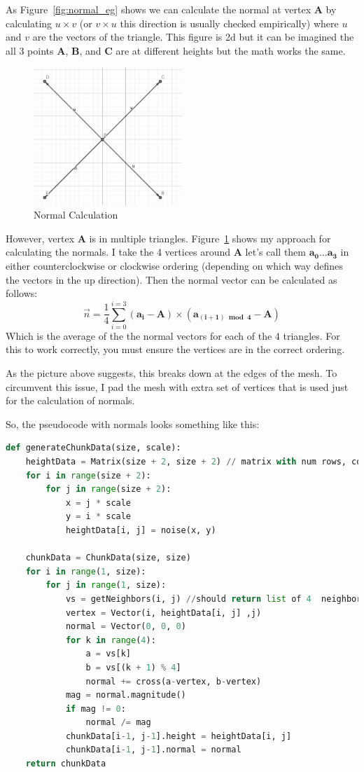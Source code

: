 As Figure~\ref{fig:normal_eg} shows we can calculate the normal at vertex \textbf{A} by calculating $u \times v$ (or $v \times u$ this direction is usually checked empirically) where $u$ and $v$ are the vectors of the triangle. This figure is 2d but it can be imagined the all 3 points \textbf{A}, \textbf{B}, and \textbf{C} are at different heights but the math works the same. 

\begin{figure}[H]
    \centering
    \includegraphics[width=0.5\textwidth]{images/normal_calc.png}
    \caption{Normal Calculation}
    \label{fig:normal_calc}
\end{figure}


However, vertex \textbf{A} is in multiple triangles. Figure~\ref{fig:normal_calc} shows my approach for calculating the normals. I take the 4 vertices around \textbf{A} let's call them $\mathbf{a_0}...\mathbf{a_3}$ in either counterclockwise or clockwise ordering (depending on which way defines the vectors in the up direction). Then the normal vector can be calculated as follows:
\[
\vec{n} = \frac{1}{4}\sum_{i=0}^{i=3}{(\mathbf{a_i}-\mathbf{A}) \times (\mathbf{a_{(i+1) \bmod 4}} - \mathbf{A})}
\]
Which is the average of the the normal vectors for each of the 4 triangles. For this to work correctly, you must ensure the vertices are in the correct ordering.

As the picture above suggests, this breaks down at the edges of the mesh. To circumvent this issue, I pad the mesh with extra set of vertices that is used just for the calculation of normals.

So, the pseudocode with normals looks something like this:
\begin{lstlisting}[language=Python]
def generateChunkData(size, scale):
	heightData = Matrix(size + 2, size + 2) // matrix with num rows, cols = size + 2
	for i in range(size + 2):
		for j in range(size + 2):
			x = j * scale
			y = i * scale
			heightData[i, j] = noise(x, y)
	
	chunkData = ChunkData(size, size)
	for i in range(1, size):
		for j in range(1, size):
			vs = getNeighbors(i, j) //should return list of 4  neighbors in the correct order
			vertex = Vector(i, heightData[i, j] ,j)
			normal = Vector(0, 0, 0)
			for k in range(4):
				a = vs[k]
				b = vs[(k + 1) % 4]
				normal += cross(a-vertex, b-vertex)
			mag = normal.magnitude()
			if mag != 0:
				normal /= mag
			chunkData[i-1, j-1].height = heightData[i, j]
			chunkData[i-1, j-1].normal = normal			
	return chunkData
\end{lstlisting}

